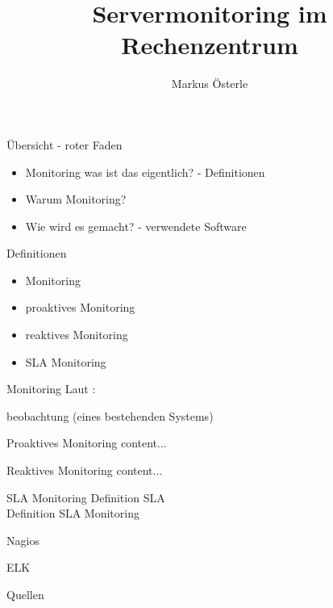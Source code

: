 \documentclass[11pt]{beamer}
\author{Markus Österle}
\title{Servermonitoring im Rechenzentrum}
\begin{document}
\begin{frame}
\titlepage
\end{frame}


\begin{frame}{Übersicht - roter Faden}
\begin{itemize}
	\item Monitoring was ist das eigentlich? - Definitionen
	\item Warum Monitoring?
	\item Wie wird es gemacht? - verwendete Software
\end{itemize}
\end{frame}
\begin{frame}{Definitionen}
\begin{itemize}
	\item Monitoring
	\item proaktives Monitoring
	\item reaktives Monitoring
	\item SLA Monitoring
\end{itemize}
\end{frame}
\begin{frame}{Monitoring}
	Laut \cite[S. 701; Stichwort Monitoring]{duden}: \\
	
	\begin{center}
		\glqq [Dauer]beobachtung (eines bestehenden Systems)\grqq
	\end{center}
	
\end{frame}
\begin{frame}{Proaktives Monitoring}
	content...
\end{frame}
\begin{frame}{Reaktives Monitoring}
	content...
\end{frame}
\begin{frame}{SLA Monitoring}
	Definition SLA \\
	Definition SLA Monitoring
\end{frame}
\begin{frame}{Nagios}

\end{frame}
\begin{frame}{ELK}

\end{frame}
\begin{frame}{Quellen}
	\printbibliography
\end{frame}
\end{document}
